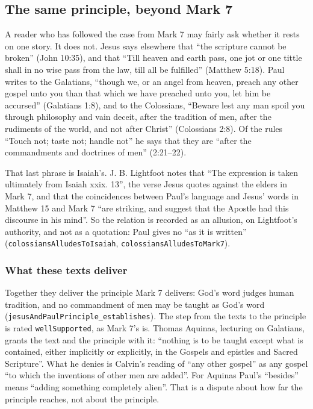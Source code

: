 \documentclass[11pt]{article}
\begin{document}
\subsection*{The same principle, beyond Mark 7}
A reader who has followed the case from Mark 7 may fairly ask whether it rests on one story. It does not. Jesus says elsewhere that “the scripture cannot be broken” (John 10:35), and that “Till heaven and earth pass, one jot or one tittle shall in no wise pass from the law, till all be fulfilled” (Matthew 5:18). Paul writes to the Galatians, “though we, or an angel from heaven, preach any other gospel unto you than that which we have preached unto you, let him be accursed” (Galatians 1:8), and to the Colossians, “Beware lest any man spoil you through philosophy and vain deceit, after the tradition of men, after the rudiments of the world, and not after Christ” (Colossians 2:8). Of the rules “Touch not; taste not; handle not” he says that they are “after the commandments and doctrines of men” (2:21–22).

That last phrase is Isaiah’s. J. B. Lightfoot notes that “The expression is taken ultimately from Isaiah xxix. 13”, the verse Jesus quotes against the elders in Mark 7, and that the coincidences between Paul’s language and Jesus’ words in Matthew 15 and Mark 7 “are striking, and suggest that the Apostle had this discourse in his mind”. So the relation is recorded as an allusion, on Lightfoot’s authority, and not as a quotation: Paul gives no “as it is written” (\texttt{colossians\allowbreak{}Alludes\allowbreak{}To\allowbreak{}Isaiah}, \texttt{colossians\allowbreak{}Alludes\allowbreak{}To\allowbreak{}Mark7}).

\subsubsection*{What these texts deliver}
Together they deliver the principle Mark 7 delivers: God’s word judges human tradition, and no commandment of men may be taught as God’s word (\texttt{jesus\allowbreak{}And\allowbreak{}Paul\allowbreak{}Principle\_\allowbreak{}establishes}). The step from the texts to the principle is rated \texttt{well\allowbreak{}Supported}, as Mark 7’s is. Thomas Aquinas, lecturing on Galatians, grants the text and the principle with it: “nothing is to be taught except what is contained, either implicitly or explicitly, in the Gospels and epistles and Sacred Scripture”. What he denies is Calvin’s reading of “any other gospel” as any gospel “to which the inventions of other men are added”. For Aquinas Paul’s “besides” means “adding something completely alien”. That is a dispute about how far the principle reaches, not about the principle.
\end{document}
